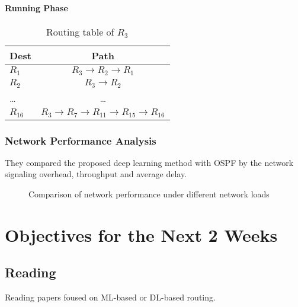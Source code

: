 \documentclass[11pt]{report}
\begin{document}
	\paragraph{Running Phase} 

	
	\begin{table}[!h]
		\centering
		\caption{Routing table of $R_3$}
		\begin{tabular}{lc}
			\toprule
			Dest& Path\\
			\hline
			$R_1$& $R_3 \to R_2 \to R_1$\\
			$R_2$& $R_3 \to R_2$\\
			\dots& \dots\\
			$R_{16}$& $R_3 \to R_7 \to R_{11} \to R_{15} \to R_{16}$\\
			\hline
		\end{tabular}
	\end{table}

	
	\subsubsection{Network Performance Analysis}
	They compared the proposed deep learning method with OSPF by the network signaling overhead, throughput and average delay. 
	\begin{figure}[!htbp]
	\centering
	\caption{Comparison of network performance under different network loads}
	\end{figure}
	
	\section{Objectives for the Next 2 Weeks}
	\subsection{Reading} 
	Reading papers foused on ML-based or DL-based routing.
\end{document}
